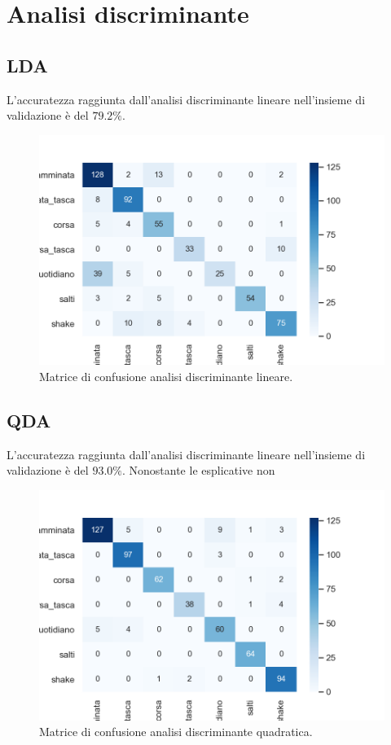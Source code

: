 \documentclass[./main.tex]{subfiles}
\begin{document}
\section{Analisi discriminante}
\subsection*{LDA}
L\rq{}accuratezza raggiunta dall\rq{}analisi discriminante lineare nell\rq{}insieme di validazione è del $79.2\%$.
\begin{figure}[H]
	\centering
	\includegraphics[width=.6\textwidth, keepaspectratio]{../../figure/matrice_confusione_lda.png}
	\caption{{Matrice di confusione analisi discriminante lineare.}}
	\label{fig:lda}
\end{figure}

\subsection*{QDA}
L\rq{}accuratezza raggiunta dall\rq{}analisi discriminante lineare nell\rq{}insieme di validazione è del $93.0\%$. Nonostante le esplicative non 
\begin{figure}[H]
	\centering
	\includegraphics[width=.6\textwidth, keepaspectratio]{../../figure/matrice_confusione_qda.png}
	\caption{{Matrice di confusione analisi discriminante quadratica.}}
	\label{fig:qda}
\end{figure}
\end{document}
